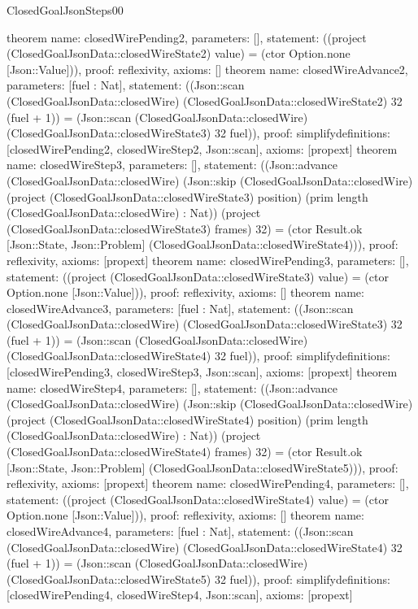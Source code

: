 \begin{lexlean}{ClosedGoalJsonSteps00}
\begin{semanticmodule}
{}
theorem{
 name: closedWirePending2, parameters: [],
 statement: ((project (ClosedGoalJsonData::closedWireState2) value) = (ctor Option.none [Json::Value])), proof: reflexivity{}, axioms: []
}
theorem{
 name: closedWireAdvance2, parameters: [fuel : Nat],
 statement: ((Json::scan (ClosedGoalJsonData::closedWire) (ClosedGoalJsonData::closedWireState2) 32 (fuel + 1)) = (Json::scan (ClosedGoalJsonData::closedWire) (ClosedGoalJsonData::closedWireState3) 32 fuel)), proof: simplify{definitions: [closedWirePending2, closedWireStep2, Json::scan]}, axioms: [propext]
}
theorem{
 name: closedWireStep3, parameters: [],
 statement: ((Json::advance (ClosedGoalJsonData::closedWire) (Json::skip (ClosedGoalJsonData::closedWire) (project (ClosedGoalJsonData::closedWireState3) position) (prim length (ClosedGoalJsonData::closedWire) : Nat)) (project (ClosedGoalJsonData::closedWireState3) frames) 32) = (ctor Result.ok [Json::State, Json::Problem] (ClosedGoalJsonData::closedWireState4))), proof: reflexivity{}, axioms: [propext]
}
theorem{
 name: closedWirePending3, parameters: [],
 statement: ((project (ClosedGoalJsonData::closedWireState3) value) = (ctor Option.none [Json::Value])), proof: reflexivity{}, axioms: []
}
theorem{
 name: closedWireAdvance3, parameters: [fuel : Nat],
 statement: ((Json::scan (ClosedGoalJsonData::closedWire) (ClosedGoalJsonData::closedWireState3) 32 (fuel + 1)) = (Json::scan (ClosedGoalJsonData::closedWire) (ClosedGoalJsonData::closedWireState4) 32 fuel)), proof: simplify{definitions: [closedWirePending3, closedWireStep3, Json::scan]}, axioms: [propext]
}
theorem{
 name: closedWireStep4, parameters: [],
 statement: ((Json::advance (ClosedGoalJsonData::closedWire) (Json::skip (ClosedGoalJsonData::closedWire) (project (ClosedGoalJsonData::closedWireState4) position) (prim length (ClosedGoalJsonData::closedWire) : Nat)) (project (ClosedGoalJsonData::closedWireState4) frames) 32) = (ctor Result.ok [Json::State, Json::Problem] (ClosedGoalJsonData::closedWireState5))), proof: reflexivity{}, axioms: [propext]
}
theorem{
 name: closedWirePending4, parameters: [],
 statement: ((project (ClosedGoalJsonData::closedWireState4) value) = (ctor Option.none [Json::Value])), proof: reflexivity{}, axioms: []
}
theorem{
 name: closedWireAdvance4, parameters: [fuel : Nat],
 statement: ((Json::scan (ClosedGoalJsonData::closedWire) (ClosedGoalJsonData::closedWireState4) 32 (fuel + 1)) = (Json::scan (ClosedGoalJsonData::closedWire) (ClosedGoalJsonData::closedWireState5) 32 fuel)), proof: simplify{definitions: [closedWirePending4, closedWireStep4, Json::scan]}, axioms: [propext]
}
\end{semanticmodule}
\end{lexlean}

